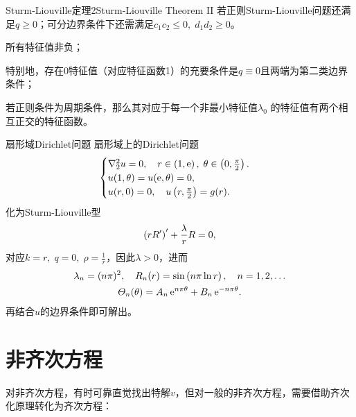 \begin{theorem}{Sturm-Liouville定理2}{Sturm-Liouville Theorem II}
	若正则Sturm-Liouville问题还满足$q\geqslant 0$；可分边界条件下还需满足$c_1c_2\leqslant 0,\;d_1d_2\geqslant 0$。
	\begin{compactenum}
		\item 所有特征值非负；

		      特别地，存在0特征值（对应特征函数1）的充要条件是$q\equiv 0$且两端为第二类边界条件；
		\item 若正则条件为周期条件，那么其对应于每一个非最小特征值$\lambda_0$
		的特征值有两个相互正交的特征函数。
	\end{compactenum}
\end{theorem}
\begin{example}{扇形域Dirichlet问题}{}
	扇形域上的Dirichlet问题
	\begin{align*}
		\begin{cases}
			\nabla^2_2u=0,\quad r\in\left(1,\mathrm e\right),\;\theta\in\left(0,\frac\pi{2}\right).\\
			u(1,\theta)=u(\mathrm e,\theta)=0,\\
			u(r,0)=0,\quad u\left(r,\frac\pi{2}\right)=g(r).
		\end{cases}
	\end{align*}
	化为Sturm-Liouville型
	\[
		\left(rR'\right)'+\frac{\lambda}rR=0,
	\]
	对应\(k=r,\;q=0,\;\rho=\frac1r\)，因此\(\lambda>0\)，进而
	\begin{gather*}
		\lambda_n=(n\pi)^2,\quad R_n(r)=\sin\left(n\pi\ln r\right),\quad n=1,2,\ldots
		\\
		\varTheta_n(\theta)=A_n\mathop{}\!\mathrm{e}^{n\pi\theta}+B_n\mathop{}\!\mathrm{e}^{-n\pi\theta}.
	\end{gather*}
	再结合$u$的边界条件即可解出。
\end{example}

\section{非齐次方程}

对非齐次方程，有时可靠直觉找出特解$v$，但对一般的非齐次方程，需要借助齐次化原理转化为齐次方程：

